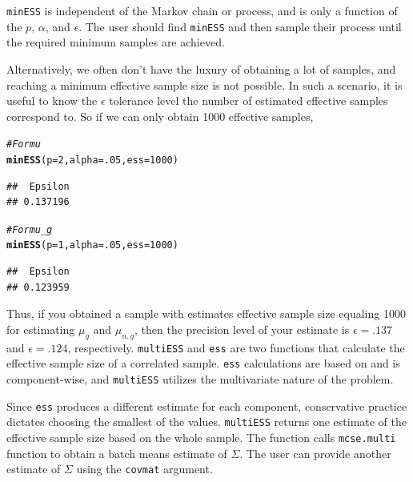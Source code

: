 \documentclass[11pt]{article}\usepackage[]{graphicx}\usepackage[]{color}
\makeatletter
\newcommand{\hlnum}[1]{\textcolor[rgb]{0.686,0.059,0.569}{#1}}%
\newcommand{\hlcom}[1]{\textcolor[rgb]{0.678,0.584,0.686}{\textit{#1}}}%
\newcommand{\hlstd}[1]{\textcolor[rgb]{0.345,0.345,0.345}{#1}}%
\newcommand{\hlkwc}[1]{\textcolor[rgb]{0.333,0.667,0.333}{#1}}%
\newcommand{\hlkwd}[1]{\textcolor[rgb]{0.737,0.353,0.396}{\textbf{#1}}}%
\newenvironment{kframe}{%
 \def\at@end@of@kframe{}%
 \ifinner\ifhmode%
  \def\at@end@of@kframe{\end{minipage}}%
  \begin{minipage}{\columnwidth}%
 \fi\fi%
 \def\FrameCommand##1{\hskip\@totalleftmargin \hskip-\fboxsep
 \colorbox{shadecolor}{##1}\hskip-\fboxsep
     \hskip-\linewidth \hskip-\@totalleftmargin \hskip\columnwidth}%
 \MakeFramed {\advance\hsize-\width
   \@totalleftmargin\z@ \linewidth\hsize
   \@setminipage}}%
 {\par\unskip\endMakeFramed%
 \at@end@of@kframe}
\newenvironment{knitrout}{}{} %
\makeatother
\begin{document}
\texttt{minESS} is independent of the Markov chain or process, and is only a function of the  $p$, $\alpha$, and $\epsilon$. The user should find \texttt{minESS} and then sample their process until the required minimum samples are achieved. 

Alternatively, we often don't have the luxury of obtaining a lot of samples, and reaching a minimum effective sample size is not possible. In such a scenario, it is useful to know the $\epsilon$ tolerance level the number of estimated effective samples correspond to. So if we can only obtain 1000 effective samples,
\begin{knitrout}
\color{fgcolor}\begin{kframe}
\begin{alltt}
\hlcom{# For mu}
\hlkwd{minESS}\hlstd{(}\hlkwc{p} \hlstd{=} \hlnum{2}\hlstd{,} \hlkwc{alpha} \hlstd{=} \hlnum{.05}\hlstd{,} \hlkwc{ess} \hlstd{=} \hlnum{1000}\hlstd{)}
\end{alltt}
\begin{verbatim}
##  Epsilon 
## 0.137196
\end{verbatim}
\begin{alltt}
\hlcom{#For mu_g}
\hlkwd{minESS}\hlstd{(}\hlkwc{p} \hlstd{=} \hlnum{1}\hlstd{,} \hlkwc{alpha} \hlstd{=} \hlnum{.05}\hlstd{,} \hlkwc{ess} \hlstd{=} \hlnum{1000}\hlstd{)}
\end{alltt}
\begin{verbatim}
##  Epsilon 
## 0.123959
\end{verbatim}
\end{kframe}
\end{knitrout}

Thus, if you obtained a sample with estimates effective sample size equaling 1000 for estimating $\mu_g$ and $\mu_{n,g}$, then the precision level of your estimate is $\epsilon = .137$ and $\epsilon = .124$, respectively.
\texttt{multiESS} and \texttt{ess} are two functions that calculate the effective sample size of a correlated sample. \texttt{ess} calculations are based on \cite{gong2015practical} and is component-wise, and \texttt{multiESS} utilizes the multivariate nature of the problem.


Since \texttt{ess} produces a different estimate for each component, conservative practice dictates choosing the smallest of the values. \texttt{multiESS} returns one estimate of the effective sample size based on the whole sample. The function calls \texttt{mcse.multi} function to obtain a batch means estimate of $\Sigma$. The user can provide another estimate of $\Sigma$ using the \texttt{covmat} argument.
\end{document}
